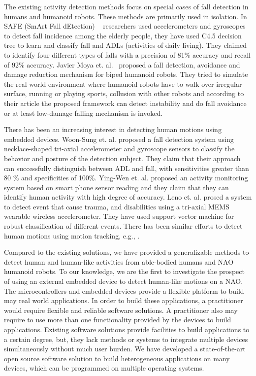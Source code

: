 \documentclass[letterpaper]{article}
\begin{document}
The existing activity detection methods focus on special cases of fall detection in humans and 
humanoid robots. These methods are primarily used in isolation.  
In SAFE (SmArt Fall dEtection) {~\cite{ojetola2011fall}} researchers used accelerometers and 
gyroscopes 
to detect fall incidence among the elderly people, they have used C4.5 decision tree to learn and 
classify fall and ADLs (activities of daily living). They claimed to identify four different types 
of falls with a precision of 81\% accuracy and recall of 92\% accuracy.
Javier Moya et. al.{~\cite{moya2014fall}} proposed a fall detection, avoidance and damage reduction 
mechanism for biped humanoid robots. They tried to simulate the real world environment where 
humanoid robots have to walk over irregular surface, running or playing sports, collusion with 
other 
robots and according to their article the proposed framework can detect instability and do fall 
avoidance or at least low-damage falling mechanism is invoked. 

There has been an increasing interest in detecting human motions using embedded devices. Woon-Sung
et. al. \cite{baek2013real} proposed  a fall  detection  system  using necklace-shaped tri-axial
accelerometer  and  gyroscope  sensors  to  classify  the  behavior  and  posture  of  the detection
 subject. They claim that their  approach  can  successfully  distinguish between  ADL and  fall, 
with  sensitivities  greater  than  80 \%  and specificities  of  100\%. Ying-Wen et. al.
\cite{bai2013recognition} proposed an activity monitoring system based on smart phone sensor
reading and they claim that they can identify human activity with high degree of accuracy. Leno et.
al. \cite{leone2013supervised} prosed a system to detect event that cause trauma, and disabilities
using a tri-axial MEMS wearable wireless accelerometer. They have used support vector machine for
robust classification of different events. There has been similar efforts to detect human motions
using motion tracking, e.g., \cite{dumitrache2013fall,kumarwearable,liang2012pre}.


Compared to the existing solutions, we have provided a generalizable methods to detect human  and 
human-like activities from able-bodied humans and NAO humanoid robots. To our knowledge, we are the 
first to investigate the prospect of using an external embedded device to detect human-like motions 
on a NAO. The microcontrollers and embedded devices provide a flexible platform to 
build may real world applications. In order to build these applications, a practitioner would 
require  flexible and reliable software solutions. A practitioner also may require to use more than 
one functionality provided by the devices to build applications. Existing software solutions 
provide facilities to build applications to a certain degree, but, they lack methods or systems to 
integrate multiple devices simultaneously without much user burden. We have developed  
a state-of-the-art open source software solution to build heterogeneous applications on many 
devices, which can be programmed on multiple operating systems. 
\end{document}
